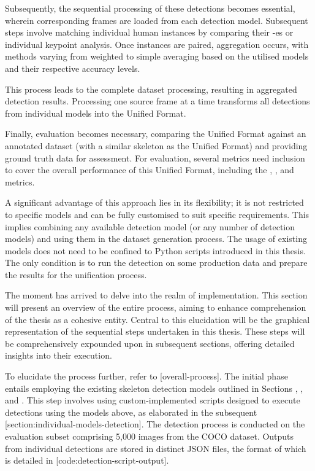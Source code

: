 Subsequently, the sequential processing of these detections becomes essential, wherein corresponding frames are loaded from each detection model. Subsequent steps involve matching individual human instances by comparing their \pojem{\BBOX}-es or individual keypoint analysis. Once instances are paired, aggregation occurs, with methods varying from weighted to simple averaging based on the utilised models and their respective accuracy levels.

This process leads to the complete dataset processing, resulting in aggregated detection results. Processing one source frame at a time transforms all detections from individual models into the Unified Format.

Finally, evaluation becomes necessary, comparing the Unified Format against an annotated dataset (with a similar skeleton as the Unified Format) and providing ground truth data for assessment. For evaluation, several metrics need inclusion to cover the overall performance of this Unified Format, including the \pojem{\APE}, \pojem{\MSE}, and \pojem{\OKS} metrics.

A significant advantage of this approach lies in its flexibility; it is not restricted to specific models and can be fully customised to suit specific requirements. This implies combining any available detection model (or any number of detection models) and using them in the dataset generation process. The usage of existing models does not need to be confined to Python scripts introduced in this thesis. The only condition is to run the detection on some production data and prepare the results for the unification process.


The moment has arrived to delve into the realm of implementation. This section will present an overview of the entire process, aiming to enhance comprehension of the thesis as a cohesive entity. Central to this elucidation will be the graphical representation of the sequential steps undertaken in this thesis. These steps will be comprehensively expounded upon in subsequent sections, offering detailed insights into their execution.

To elucidate the process further, refer to [overall-process]. The initial phase entails employing the existing skeleton detection models outlined in Sections , , and . This step involves using custom-implemented scripts de\-signed to execute detections using the models above, as elaborated in the subsequent [section:individual-models-detection]. The detection process is conducted on the evaluation subset comprising 5,000 images from the COCO dataset. Outputs from individual detections are stored in distinct JSON files, the format of which is detailed in [code:detection-script-output].

